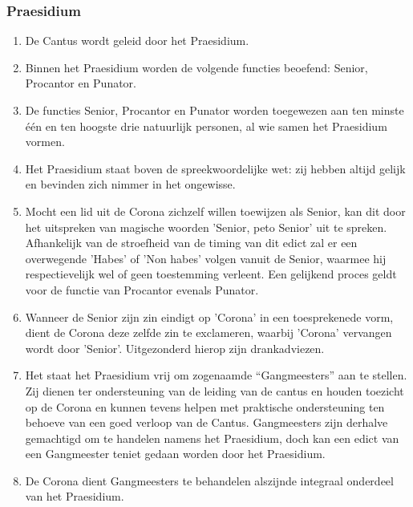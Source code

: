 \subsubsection*{Praesidium}
\footnotesize

\begin{enumerate}
    \item De Cantus wordt geleid door het Praesidium.
    \item Binnen het Praesidium worden de volgende functies beoefend: Senior, Procantor en Punator.
    \item De functies Senior, Procantor en Punator worden toegewezen aan ten minste één en ten hoogste drie natuurlijk personen, al wie samen het Praesidium vormen.
    \item Het Praesidium staat boven de spreekwoordelijke wet: zij hebben altijd gelijk en bevinden zich nimmer in het ongewisse. 
    \item Mocht een lid uit de Corona zichzelf willen toewijzen als Senior, kan dit door het uitspreken van magische woorden 'Senior, peto Senior' uit te spreken. Afhankelijk van de stroefheid van de timing van dit edict zal er een overwegende 'Habes' of 'Non habes' volgen vanuit de Senior, waarmee hij respectievelijk wel of geen toestemming verleent. Een gelijkend proces geldt voor de functie van Procantor evenals Punator.
    \item Wanneer de Senior zijn zin eindigt op 'Corona' in een toesprekenede vorm, dient de Corona deze zelfde zin te exclameren, waarbij 'Corona' vervangen wordt door 'Senior'. Uitgezonderd hierop zijn drankadviezen.
    \item Het staat het Praesidium vrij om zogenaamde ``Gangmeesters'' aan te stellen. Zij dienen ter ondersteuning van de leiding van de cantus en houden toezicht op de Corona en kunnen tevens helpen met praktische ondersteuning ten behoeve van een goed verloop van de Cantus. Gangmeesters zijn derhalve gemachtigd om te handelen namens het Praesidium, doch kan een edict van een Gangmeester teniet gedaan worden door het Praesidium.
    \item De Corona dient Gangmeesters te behandelen alszijnde integraal onderdeel van het Praesidium. 
\end{enumerate}

